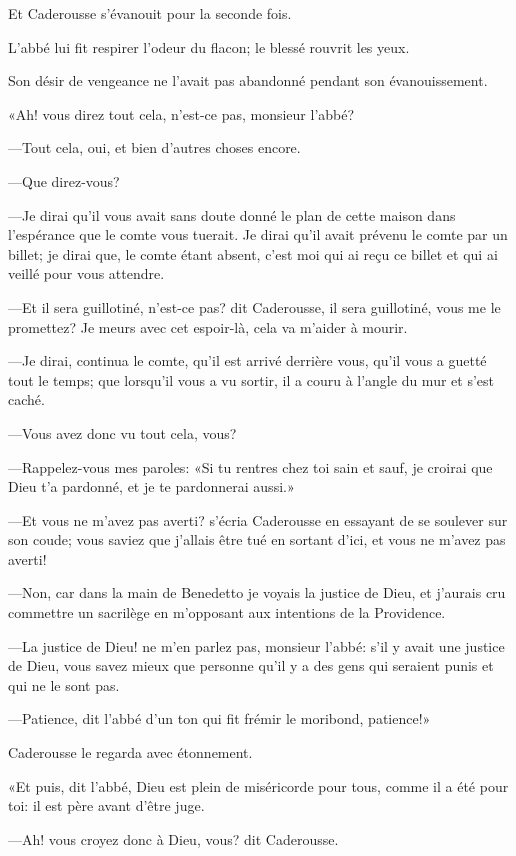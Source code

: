 Et Caderousse s'évanouit pour la seconde fois. 

L'abbé lui fit respirer l'odeur du flacon; le blessé rouvrit les yeux. 

Son désir de vengeance ne l'avait pas abandonné pendant son évanouissement. 

«Ah! vous direz tout cela, n'est-ce pas, monsieur l'abbé? 

—Tout cela, oui, et bien d'autres choses encore. 

—Que direz-vous? 

—Je dirai qu'il vous avait sans doute donné le plan de cette maison dans l'espérance que le comte vous tuerait. Je dirai qu'il avait prévenu le comte par un billet; je dirai que, le comte étant absent, c'est moi qui ai reçu ce billet et qui ai veillé pour vous attendre. 

—Et il sera guillotiné, n'est-ce pas? dit Caderousse, il sera guillotiné, vous me le promettez? Je meurs avec cet espoir-là, cela va m'aider à mourir. 

—Je dirai, continua le comte, qu'il est arrivé derrière vous, qu'il vous a guetté tout le temps; que lorsqu'il vous a vu sortir, il a couru à l'angle du mur et s'est caché. 

—Vous avez donc vu tout cela, vous? 

—Rappelez-vous mes paroles: «Si tu rentres chez toi sain et sauf, je croirai que Dieu t'a pardonné, et je te pardonnerai aussi.»  

—Et vous ne m'avez pas averti? s'écria Caderousse en essayant de se soulever sur son coude; vous saviez que j'allais être tué en sortant d'ici, et vous ne m'avez pas averti! 

—Non, car dans la main de Benedetto je voyais la justice de Dieu, et j'aurais cru commettre un sacrilège en m'opposant aux intentions de la Providence. 

—La justice de Dieu! ne m'en parlez pas, monsieur l'abbé: s'il y avait une justice de Dieu, vous savez mieux que personne qu'il y a des gens qui seraient punis et qui ne le sont pas. 

—Patience, dit l'abbé d'un ton qui fit frémir le moribond, patience!» 

Caderousse le regarda avec étonnement. 

«Et puis, dit l'abbé, Dieu est plein de miséricorde pour tous, comme il a été pour toi: il est père avant d'être juge. 

—Ah! vous croyez donc à Dieu, vous? dit Caderousse. 

